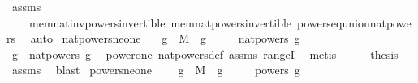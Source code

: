 \begin{isabellebody}
\ assms\ \isanewline
\ \ \ \ mem{\isacharunderscore}{\kern0pt}nat{\isacharunderscore}{\kern0pt}inv{\isacharunderscore}{\kern0pt}powers{\isacharunderscore}{\kern0pt}invertible\ mem{\isacharunderscore}{\kern0pt}nat{\isacharunderscore}{\kern0pt}powers{\isacharunderscore}{\kern0pt}invertible\ powers{\isacharunderscore}{\kern0pt}eq{\isacharunderscore}{\kern0pt}union{\isacharunderscore}{\kern0pt}nat{\isacharunderscore}{\kern0pt}powers\ \isamarkupfalse%
\ auto\isanewline
{}\isamarkupfalse%
%
\endisatagproof
{\isafoldproof}%
%
\isadelimproof
\isanewline
%
\endisadelimproof
\isanewline
{}\isamarkupfalse%
\ nat{\isacharunderscore}{\kern0pt}powers{\isacharunderscore}{\kern0pt}ne{\isacharunderscore}{\kern0pt}one{\isacharcolon}{\kern0pt}\isanewline
\ \ \ {\isachardoublequoteopen}g\ {\isasymin}\ M{\isachardoublequoteclose}\ \ {\isachardoublequoteopen}g\ {\isasymnoteq}\ {\isasymone}{\isachardoublequoteclose}\isanewline
\ \ \ {\isachardoublequoteopen}nat{\isacharunderscore}{\kern0pt}powers\ g\ {\isasymnoteq}\ {\isacharbraceleft}{\kern0pt}{\isasymone}{\isacharbraceright}{\kern0pt}{\isachardoublequoteclose}\isanewline
%
\isadelimproof
%
\endisadelimproof
%
\isatagproof
{}\isamarkupfalse%
{\isacharminus}{\kern0pt}\isanewline
\ \ \isamarkupfalse%
\ {\isachardoublequoteopen}g\ {\isasymin}\ nat{\isacharunderscore}{\kern0pt}powers\ g{\isachardoublequoteclose}\ \isamarkupfalse%
\ power{\isacharunderscore}{\kern0pt}one\ nat{\isacharunderscore}{\kern0pt}powers{\isacharunderscore}{\kern0pt}def\ assms\ rangeI\ \isamarkupfalse%
\ metis\isanewline
\ \ \isamarkupfalse%
\ \isamarkupfalse%
\ {\isacharquery}{\kern0pt}thesis\ \isamarkupfalse%
\ assms\ \isamarkupfalse%
\ blast\isanewline
{}\isamarkupfalse%
%
\endisatagproof
{\isafoldproof}%
%
\isadelimproof
\isanewline
%
\endisadelimproof
\isanewline
{}\isamarkupfalse%
\ powers{\isacharunderscore}{\kern0pt}ne{\isacharunderscore}{\kern0pt}one{\isacharcolon}{\kern0pt}\ \isanewline
\ \ \ {\isachardoublequoteopen}g\ {\isasymin}\ M{\isachardoublequoteclose}\ \ {\isachardoublequoteopen}g\ {\isasymnoteq}\ {\isasymone}{\isachardoublequoteclose}\isanewline
\ \ \ {\isachardoublequoteopen}powers\ g\ {\isasymnoteq}\ {\isacharbraceleft}{\kern0pt}{\isasymone}{\isacharbraceright}{\kern0pt}{\isachardoublequoteclose}%
\isadelimproof
\ %
\endisadelimproof

\end{isabellebody}
